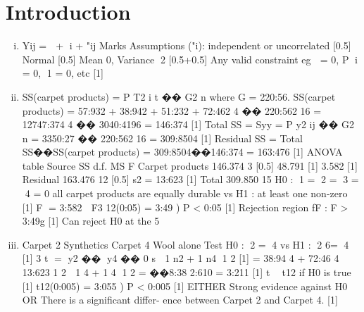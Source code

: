 \documentclass{article}
\author{kobriendublin }
\date{December 2018}
\begin{document}
\section{Introduction}
\begin{enumerate}[(i)]
\item
Yij =  + i + "ij
Marks Assumptions ("i):
independent or uncorrelated [0.5]
Normal [0.5]
Mean 0, Variance 2 [0.5+0.5]
Any valid constraint eg  = 0,
P
i = 0, 1 = 0, etc [1]
\item 
SS(carpet products) =
P
T2
i
t
��
G2
n
where G = 220:56.
SS(carpet products) =
57:932 + 38:942 + 51:232 + 72:462
4
��
220:562
16
=
12747:374
4
�� 3040:4196
= 146:374 [1]
Total SS = Syy =
P
y2
ij �� G2
n = 3350:27 �� 220:562
16 = 309:8504 [1]
Residual SS = Total SS��SS(carpet products) = 309:8504��146:374 =
163:476 [1]
ANOVA table
Source SS d.f. MS F
Carpet products 146.374 3 [0.5] 48.791 [1] 3.582 [1]
Residual 163.476 12 [0.5] s2 = 13:623 [1]
Total 309.850 15
H0 : 1 = 2 = 3 = 4 = 0 all carpet products are equally durable
vs H1 : at least one non-zero [1]
F = 3:582  F3
12(0:05) = 3:49 ) P < 0:05
[1]
Rejection region fF : F > 3:49g [1]
Can reject H0 at the 5%
\item Carpet 2 Synthetics Carpet 4 Wool alone
Test H0 : 2 = 4 vs H1 : 2 6= 4 [1]
3
t =
y2 �� y4 �� 0
s

1
n2
+ 1
n4
1
2
[1]
=
38:94
4 + 72:46
4
13:623
1
2

1
4 + 1
4
1
2
=
��8:38
2:610
= 3:211 [1]
t  t12 if H0 is true [1]
t12(0:005) = 3:055 ) P < 0:005 [1]
EITHER Strong evidence against H0 OR There is a significant differ-
ence between Carpet 2 and Carpet 4. [1]
\end{enumerate}
\end{document}
